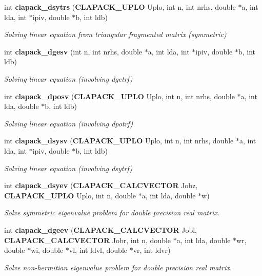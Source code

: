 \begin{DoxyCompactItemize}
int {\bf clapack\-\_\-dsytrs} ({\bf C\-L\-A\-P\-A\-C\-K\-\_\-\-U\-P\-L\-O} Uplo, int n, int nrhs, double $\ast$a, int lda, int $\ast$ipiv, double $\ast$b, int ldb)
\begin{DoxyCompactList}\small\item\em Solving linear equation from triangular fragmented matrix (symmetric) \end{DoxyCompactList}\item 
int {\bf clapack\-\_\-dgesv} (int n, int nrhs, double $\ast$a, int lda, int $\ast$ipiv, double $\ast$b, int ldb)
\begin{DoxyCompactList}\small\item\em Solving linear equation (involving dgetrf) \end{DoxyCompactList}\item 
int {\bf clapack\-\_\-dposv} ({\bf C\-L\-A\-P\-A\-C\-K\-\_\-\-U\-P\-L\-O} Uplo, int n, int nrhs, double $\ast$a, int lda, double $\ast$b, int ldb)
\begin{DoxyCompactList}\small\item\em Solving linear equation (involving dpotrf) \end{DoxyCompactList}\item 
int {\bf clapack\-\_\-dsysv} ({\bf C\-L\-A\-P\-A\-C\-K\-\_\-\-U\-P\-L\-O} Uplo, int n, int nrhs, double $\ast$a, int lda, int $\ast$ipiv, double $\ast$b, int ldb)
\begin{DoxyCompactList}\small\item\em Solving linear equation (involving dsytrf) \end{DoxyCompactList}\item 
int {\bf clapack\-\_\-dsyev} ({\bf C\-L\-A\-P\-A\-C\-K\-\_\-\-C\-A\-L\-C\-V\-E\-C\-T\-O\-R} Jobz, {\bf C\-L\-A\-P\-A\-C\-K\-\_\-\-U\-P\-L\-O} Uplo, int n, double $\ast$a, int lda, double $\ast$w)
\begin{DoxyCompactList}\small\item\em Solve symmetric eigenvalue problem for double precision real matrix. \end{DoxyCompactList}\item 
int {\bf clapack\-\_\-dgeev} ({\bf C\-L\-A\-P\-A\-C\-K\-\_\-\-C\-A\-L\-C\-V\-E\-C\-T\-O\-R} Jobl, {\bf C\-L\-A\-P\-A\-C\-K\-\_\-\-C\-A\-L\-C\-V\-E\-C\-T\-O\-R} Jobr, int n, double $\ast$a, int lda, double $\ast$wr, double $\ast$wi, double $\ast$vl, int ldvl, double $\ast$vr, int ldvr)
\begin{DoxyCompactList}\small\item\em Solve non-\/hermitian eigenvalue problem for double precision real matrix. \end{DoxyCompactList}\item 

\end{DoxyCompactItemize}
